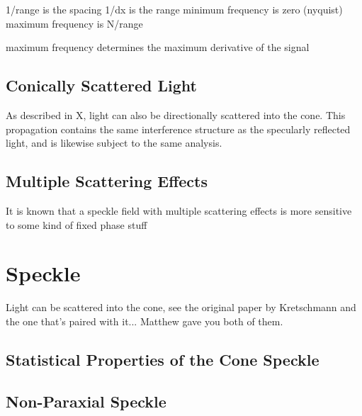 \documentclass[a4paper,titlepage,onecolumn]{report}
\begin{document}
1/range is the spacing
1/dx is the range
minimum frequency is zero (nyquist)
maximum frequency is N/range

maximum frequency determines the maximum derivative of the signal


% 



\section{Conically Scattered Light}

As described in X, light can also be directionally scattered into
the cone. This propagation contains the same interference structure
as the specularly reflected light, and is likewise subject to the
same analysis.


\section{Multiple Scattering Effects}

It is known that a speckle field with multiple scattering effects
is more sensitive to some kind of fixed phase stuff 

\chapter{Speckle}

Light can be scattered into the cone, see the original paper by Kretschmann
and the one that's paired with it... Matthew gave you both of them.

\section{Statistical Properties of the Cone Speckle}

\section{Non-Paraxial Speckle}
\end{document}
